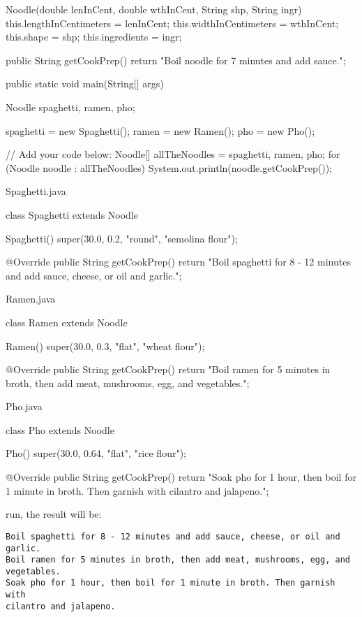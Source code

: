 \documentclass[a4paper,12pt]{article}
\begin{document}
\begin{enumerate}
\begin{javacode}
{  Noodle(double lenInCent, double wthInCent, String shp, String ingr) {    
    this.lengthInCentimeters = lenInCent;
    this.widthInCentimeters = wthInCent;
    this.shape = shp;
    this.ingredients = ingr;    
  }
  
  public String getCookPrep() {    
    return "Boil noodle for 7 minutes and add sauce.";    
  }
    
  public static void main(String[] args) {    
    Noodle spaghetti, ramen, pho;
    
    spaghetti = new Spaghetti();
    ramen = new Ramen();
    pho = new Pho();
    
    // Add your code below:
    Noodle[] allTheNoodles = {spaghetti, ramen, pho};
    for (Noodle noodle : allTheNoodles) {
      System.out.println(noodle.getCookPrep());
    }
  }  
}
\end{javacode}

Spaghetti.java
\begin{javacode}
class Spaghetti extends Noodle {  
  Spaghetti() {    
  	super(30.0, 0.2, "round", "semolina flour");    
  }
  
  @Override
  public String getCookPrep() {    
    return "Boil spaghetti for 8 - 12 minutes and add sauce, cheese, or oil and garlic.";    
  }  
}
\end{javacode}

Ramen.java
\begin{javacode}
class Ramen extends Noodle {  
  Ramen() {    
    super(30.0, 0.3, "flat", "wheat flour");    
  }
  
  @Override
  public String getCookPrep() {    
    return "Boil ramen for 5 minutes in broth, then add meat, mushrooms, egg, and vegetables.";    
  }  
}
\end{javacode}

Pho.java
\begin{javacode}
class Pho extends Noodle {  
  Pho() {    
    super(30.0, 0.64, "flat", "rice flour");    
  }
  
  @Override
  public String getCookPrep() {    
    return "Soak pho for 1 hour, then boil for 1 minute in broth. Then garnish with cilantro and jalapeno.";    
  }  
}
\end{javacode}
run, the result will be:
\begin{verbatim}
Boil spaghetti for 8 - 12 minutes and add sauce, cheese, or oil and garlic.
Boil ramen for 5 minutes in broth, then add meat, mushrooms, egg, and 
vegetables.
Soak pho for 1 hour, then boil for 1 minute in broth. Then garnish with 
cilantro and jalapeno.
\end{verbatim}


\end{enumerate}
\end{document}
